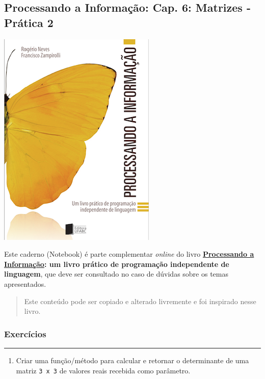 \documentclass[12pt,a4paper]{article}
\providecommand{\tightlist}{%
      \setlength{\itemsep}{0pt}\setlength{\parskip}{0pt}}
\begin{document}
    \hypertarget{processando-a-informauxe7uxe3o-cap.-6-matrizes---pruxe1tica-2}{%
\subsection{Processando a Informação: Cap. 6: Matrizes - Prática
2}\label{processando-a-informauxe7uxe3o-cap.-6-matrizes---pruxe1tica-2}}

    \includegraphics{"figs/Capa_Processando_Informacao.jpg"}

Este caderno (Notebook) é parte complementar \emph{online} do livro
\textbf{\href{https://editora.ufabc.edu.br/matematica-e-ciencias-da-computacao/58-processando-a-informacao}{Processando
a Informação}: um livro prático de programação independente de
linguagem}, que deve ser consultado no caso de dúvidas sobre os temas
apresentados.

\begin{quote}
Este conteúdo pode ser copiado e alterado livremente e foi inspirado
nesse livro.
\end{quote}

    \hypertarget{exercuxedcios}{%
\subsubsection{Exercícios}\label{exercuxedcios}}

    \begin{center}\rule{0.5\linewidth}{0.5pt}\end{center}

\begin{enumerate}
\def\labelenumi{\arabic{enumi}.}
\tightlist
\item
  Criar uma função/método para calcular e retornar o determinante de uma
  matriz \texttt{3\ x\ 3} de valores reais recebida como parâmetro.
\end{enumerate}
\end{document}
